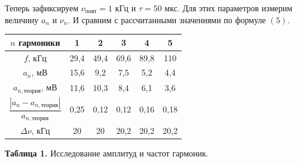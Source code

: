 \documentclass[a4paper, 12pt]{article}%
\begin{document}
\begin{figure}[h]
    \end{figure}
    
\begin{figure}[h!]
\centering
\end{figure}

Теперь зафиксируем $\nu_{\text{повт}} = 1$ кГц и $\tau = 50$ мкс. Для этих параметров измерим величину $a_n$ и $\nu_n$. И сравним с рассчитанными значениями по формуле $(5)$.

\begin{center}
\begin{tabular}{|c|c|c|c|c|c|}
\hline
$n$ гармоники & 1 & 2 & 3 & 4 & 5 \\ \hline
$f$, кГц & 29,4 & 49,4 & 69,6 & 89,8 & 110 \\ \hline
$a_n$, мВ & 15,6 & 9,2 & 7,5 & 5,2 & 4,4 \\ \hline
$a_{n, \text{теория}}$, мВ & 11,6 & 10,3 & 8,4 & 6,1 & 3,6 \\ \hline
$\dfrac{\left|a_n - a_{n, \text{теория}}\right|}{a_{n, \text{теория}}}$ & 0,25 & 0,12 & 0,12 & 0,16 & 0,18 \\ \hline
$\Delta \nu$, кГц & 20 & 20 & 20,2 & 20,2 & 20,2 \\ \hline
\end{tabular}

\textbf{Таблица 1.} Исследование амплитуд и частот гармоник. 
\end{center}
\end{document}
